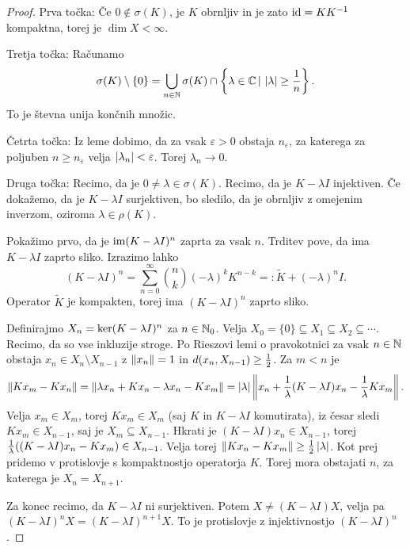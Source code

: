\begin{proof}
  Prva točka:
  Če $0 \notin \sigma(K)$, je $K$ obrnljiv in je zato $\operatorname{id} = K K^{-1}$
  kompaktna, torej je $\dim X < \infty$.

  Tretja točka:
  Računamo
  \[
	\sigma(K) \setminus \{0\}
	= \bigcup_{n \in \mathbb{N}} \sigma(K) \cap \left\{ \lambda \in \mathbb{C} \,|\, \left| \lambda \right|
	\ge \frac{1}{n} \right\}.
  \]
  To je števna unija končnih množic.

  Četrta točka:
  Iz leme dobimo, da za vsak $\varepsilon > 0$ obstaja $n_\varepsilon$, za
  katerega za poljuben $n \ge n_\varepsilon$ velja $\left| \lambda_n \right| <
  \varepsilon$.
  Torej $\lambda_n \to 0$.

  Druga točka:
  Recimo, da je $0 \ne \lambda \in \sigma(K)$.
  Recimo, da je $K - \lambda I$ injektiven.
  Če dokažemo, da je $K - \lambda I$ surjektiven, bo sledilo, da je obrnljiv z
  omejenim inverzom, oziroma $\lambda \in \rho(K)$.

  Pokažimo prvo, da je $\operatorname{im} (K - \lambda I)^n$ zaprta za vsak $n$.
  Trditev pove, da ima $K - \lambda I$ zaprto sliko.
  Izrazimo lahko
  \[
	(K - \lambda I)^n
	= \sum_{n=0}^\infty \binom{n}{k} (-\lambda)^k K^{n-k}
	=: \tilde{K} + (-\lambda)^n I.
  \]
  Operator $\tilde{K}$ je kompakten, torej ima $(K - \lambda I)^n$ zaprto sliko.

  Definirajmo $X_n = \operatorname{ker} (K - \lambda I)^n$ za $n \in \mathbb{N}_0$.
  Velja $X_0 = \{0\} \subseteq X_1 \subseteq X_2 \subseteq \cdots$.
  Recimo, da so vse inkluzije stroge.
  Po Rieszovi lemi o pravokotnici za vsak $n \in \mathbb{N}$ obstaja $x_n \in X_n
  \setminus X_{n-1}$ z $\left\lVert x_n\right\rVert = 1$ in $d(x_n, X_{n-1}) \ge \frac{1}{2}$.
  Za $m < n$ je
  \[
	\left\lVert K x_m - K x_n\right\rVert
	= \left\lVert\lambda x_n + K x_n - \lambda x_n - K x_m\right\rVert
	= \left| \lambda \right| \left\lVert x_n + \frac{1}{\lambda} (K - \lambda I) x_n -
	  \frac{1}{\lambda} K x_m\right\rVert.
  \]
  Velja $x_m \in X_m$, torej $K x_m \in X_m$ (saj $K$ in $K - \lambda I$
  komutirata), iz česar sledi $K x_m \in X_{n-1}$, saj je $X_m \subseteq
  X_{n-1}$.
  Hkrati je $(K - \lambda I) x_n \in X_{n-1}$, torej
  $\frac{1}{\lambda}((K - \lambda I) x_n - K x_m) \in X_{n-1}$.
  Velja torej $\left\lVert K x_n - K x_m\right\rVert \ge \frac{1}{2} \left| \lambda \right|$.
  Kot prej pridemo v protislovje s kompaktnostjo operatorja $K$.
  Torej mora obstajati $n$, za katerega je $X_n = X_{n+1}$.

  Za konec recimo, da $K - \lambda I$ ni surjektiven.
  Potem $X \ne (K - \lambda I) X$, velja pa $(K - \lambda I)^n X = (K - \lambda
  I)^{n+1} X$.
  To je protislovje z injektivnostjo $(K - \lambda I)^n$.
\end{proof}

